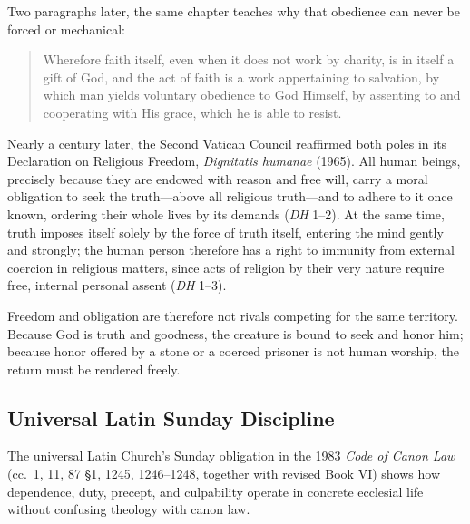 Two paragraphs later, the same chapter teaches why that obedience can never be forced or mechanical:

\begin{quote}
Wherefore faith itself, even when it does not work by charity, is in itself a gift of God, and the act of faith is a work appertaining to salvation, by which man yields voluntary obedience to God Himself, by assenting to and cooperating with His grace, which he is able to resist.
\end{quote}

Nearly a century later, the Second Vatican Council reaffirmed both poles in its Declaration on Religious Freedom, \emph{Dignitatis humanae} (1965). All human beings, precisely because they are endowed with reason and free will, carry a moral obligation to seek the truth---above all religious truth---and to adhere to it once known, ordering their whole lives by its demands (\emph{DH} 1--2). At the same time, truth imposes itself solely by the force of truth itself, entering the mind gently and strongly; the human person therefore has a right to immunity from external coercion in religious matters, since acts of religion by their very nature require free, internal personal assent (\emph{DH} 1--3).

Freedom and obligation are therefore not rivals competing for the same territory. Because God is truth and goodness, the creature is bound to seek and honor him; because honor offered by a stone or a coerced prisoner is not human worship, the return must be rendered freely.

\subsection{Universal Latin Sunday Discipline}

The universal Latin Church's Sunday obligation in the 1983 \emph{Code of Canon Law} (cc.\ 1, 11, 87 \S 1, 1245, 1246--1248, together with revised Book VI) shows how dependence, duty, precept, and culpability operate in concrete ecclesial life without confusing theology with canon law.

